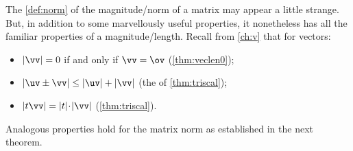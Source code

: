The \autoref{def:norm} of the magnitude\slash norm of a matrix may appear a little strange. 
But, in addition to some marvellously useful properties, it nonetheless has all the familiar properties of a magnitude\slash length.
Recall from \autoref{ch:v} that for vectors:
\begin{itemize}
\item \(|\vv|=0\) if and only if \(\vv=\ov\) (\autoref{thm:veclen0});
\item \(|\uv\pm\vv|\leq|\uv|+|\vv|\) (the  of \autoref{thm:triscal});
\item \(|t\vv|=|t|\cdot|\vv|\) (\autoref{thm:triscal}).
\end{itemize}
Analogous properties hold for the matrix norm as established in the next theorem.




